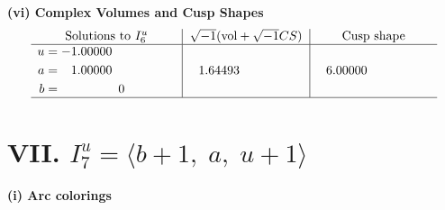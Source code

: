 \documentclass[1p]{elsarticle_modified}
\theoremstyle{definition}
\newcommand{\I}{\sqrt{-1}}
\begin{document}
\newpage\flushleft \textbf{(vi) Complex Volumes and Cusp Shapes}
$$\begin{array}{c|c|c}  
\text{Solutions to }I^u_{6}& \I (\text{vol} + \sqrt{-1}CS) & \text{Cusp shape}\\
 \hline 
\begin{aligned}
u &= -1.00000\phantom{ +0.000000I} \\
a &= \phantom{-}1.00000\phantom{ +0.000000I} \\
b &= \phantom{-0.000000 } 0\end{aligned}
 & \phantom{-}1.64493\phantom{ +0.000000I} & \phantom{-}6.00000\phantom{ +0.000000I}\\
 \hline 
 \end{array}$$\newpage\newpage\renewcommand{\arraystretch}{1}
\centering \section*{VII. $I^u_{7}= \langle b+1,\;a,\;u+1 \rangle$}
\flushleft \textbf{(i) Arc colorings}\\
\end{document}
